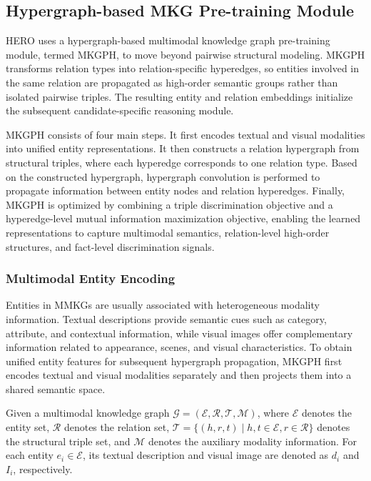 \documentclass[pdflatex,sn-mathphys-num]{sn-jnl}
\begin{document}
\subsection{Hypergraph-based MKG Pre-training Module}

HERO uses a hypergraph-based multimodal knowledge graph pre-training module, termed MKGPH, to move beyond pairwise structural modeling. MKGPH transforms relation types into relation-specific hyperedges, so entities involved in the same relation are propagated as high-order semantic groups rather than isolated pairwise triples. The resulting entity and relation embeddings initialize the subsequent candidate-specific reasoning module.

MKGPH consists of four main steps. It first encodes textual and visual modalities into unified entity representations. It then constructs a relation hypergraph from structural triples, where each hyperedge corresponds to one relation type. Based on the constructed hypergraph, hypergraph convolution is performed to propagate information between entity nodes and relation hyperedges. Finally, MKGPH is optimized by combining a triple discrimination objective and a hyperedge-level mutual information maximization objective, enabling the learned representations to capture multimodal semantics, relation-level high-order structures, and fact-level discrimination signals.

\subsubsection{Multimodal Entity Encoding}

Entities in MMKGs are usually associated with heterogeneous modality information. Textual descriptions provide semantic cues such as category, attribute, and contextual information, while visual images offer complementary information related to appearance, scenes, and visual characteristics. To obtain unified entity features for subsequent hypergraph propagation, MKGPH first encodes textual and visual modalities separately and then projects them into a shared semantic space.

Given a multimodal knowledge graph $\mathcal{G}=(\mathcal{E},\mathcal{R},\mathcal{T},\mathcal{M})$, where $\mathcal{E}$ denotes the entity set, $\mathcal{R}$ denotes the relation set, $\mathcal{T}=\{(h,r,t)\mid h,t\in\mathcal{E},r\in\mathcal{R}\}$ denotes the structural triple set, and $\mathcal{M}$ denotes the auxiliary modality information. For each entity $e_i\in\mathcal{E}$, its textual description and visual image are denoted as $d_i$ and $I_i$, respectively.
\end{document}
